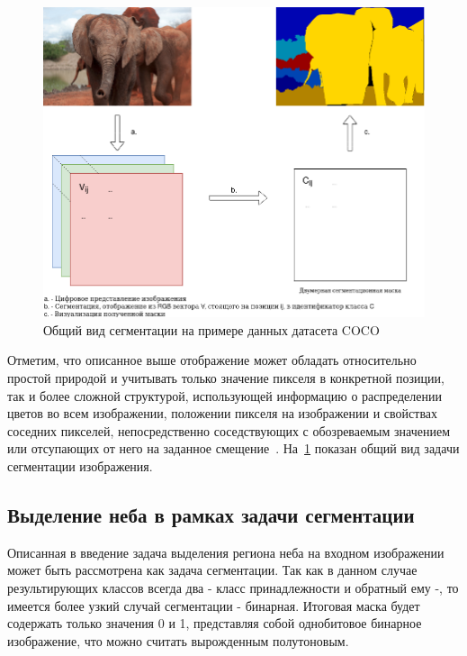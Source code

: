 \begin{figure}[H]
    \centering
    \includegraphics[width=\textwidth]{img/example_segmentation.png}
    \caption{Общий вид сегментации на примере данных датасета COCO}
    \label{fig:seg_example}
\end{figure}

Отметим, что описанное выше отображение может обладать относительно простой природой и учитывать только значение пикселя в конкретной позиции,
так и более сложной структурой, использующей информацию о распределении цветов во всем изображении, положении пикселя на изображении и
свойствах соседних пикселей, непосредственно соседствующих с обозреваемым значением или отсупающих от него на заданное смещение~\autocite{liu2018recent}.
На~\ref{fig:seg_example} показан общий вид задачи сегментации изображения.

\subsection{Выделение неба в рамках задачи сегментации}

Описанная в введение задача выделения региона неба на входном изображении может быть рассмотрена как задача сегментации.
Так как в данном случае результирующих классов всегда два - класс принадлежности и обратный ему -, то имеется более узкий случай сегментации - бинарная.
Итоговая маска будет содержать только значения 0 и 1, представляя собой однобитовое бинарное изображение, что можно считать вырожденным полутоновым.

